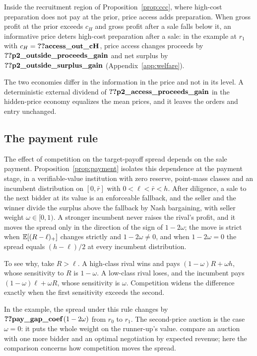 Inside the recruitment region of Proposition~\ref{prop:ccc}, where high-cost preparation does not pay at the prior,
price access adds preparation. When gross profit at the prior exceeds \(c_H\) and gross profit after a sale falls below it, an informative price
deters high-cost preparation after a sale: in the example at \(r_1\) with \(c_H=\reg{access_out_cH}\), price access changes proceeds by
\(\reg{p2_outside_proceeds_gain}\) and net surplus by \(\reg{p2_outside_surplus_gain}\)
(Appendix~\ref{app:welfare}).

The two economies differ in the information in the price and not in its level. A deterministic external dividend of
\(\reg{p2_access_proceeds_gain}\) in the hidden-price economy equalizes the mean prices, and it leaves the orders
and entry unchanged.

\subsection{The payment rule}\label{sec:payment}

The effect of competition on the target-payoff spread depends on the sale payment.
Proposition~\ref{prop:payment} isolates this dependence at the payment stage, in a
verifiable-value institution with zero reserve, point-mass classes and an incumbent distribution on \([0,\bar r]\)
with \(0<\ell<\bar r<h\). After diligence, a sale to the next bidder at its value is an
enforceable fallback, and the seller and the winner divide the surplus above the fallback by Nash bargaining, with
seller weight \(\omega\in[0,1)\). A stronger incumbent never raises the rival's profit, and it moves the
spread only in the direction of the sign of \(1-2\omega\); the move is strict when \(\mathbb{E}[(R-\ell)_+]\) changes
strictly and \(1-2\omega\ne0\), and when \(1-2\omega=0\) the spread equals \((h-\ell)/2\) at every incumbent
distribution.

To see why, take \(R>\ell\). A high-class rival wins and pays \((1-\omega)R+\omega h\), whose sensitivity to
\(R\) is \(1-\omega\). A low-class rival loses, and the incumbent pays \((1-\omega)\ell+\omega R\), whose
sensitivity is \(\omega\). Competition widens the difference exactly when the first sensitivity exceeds the second.

In the example, the spread under this rule changes by \(\reg{pay_gap_coef}\,(1-2\omega)\) from \(r_0\) to \(r_1\).
The second-price auction is the case \(\omega=0\): it puts the whole weight on the runner-up's value.
\citet{BulowKlemperer1996} compare an auction with one more bidder and an optimal negotiation by expected revenue;
here the comparison concerns how competition moves the spread.

